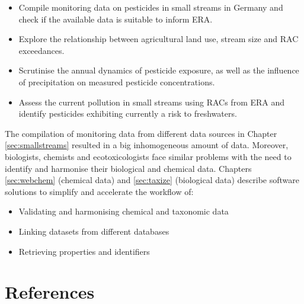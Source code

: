\begin{itemize}
	\item Compile monitoring data on pesticides in small streams in Germany and check if the available data is suitable to inform ERA.
	\item Explore the relationship between agricultural land use, stream size and RAC exceedances.
	\item Scrutinise the annual dynamics of pesticide exposure, as well as the influence of precipitation on measured pesticide concentrations.
	\item Assess the current pollution in small streams using RACs from ERA and identify pesticides exhibiting currently a risk to freshwaters.
\end{itemize}

\noindent
The compilation of monitoring data from different data sources in Chapter \ref{sec:smallstreams} resulted in a big inhomogeneous amount of data.
Moreover, biologists, chemists and ecotoxicologists face similar problems with the need to identify and harmonise their biological and chemical data.
Chapters \ref{sec:webchem} (chemical data) and \ref{sec:taxize} (biological data) describe software solutions to simplify and accelerate the workflow of:

\begin{itemize}
	\item Validating and harmonising chemical and taxonomic data
	\item Linking datasets from different databases
	\item Retrieving properties and identifiers
\end{itemize}






\clearpage
\section{References}
\printbibliography[heading=none]
